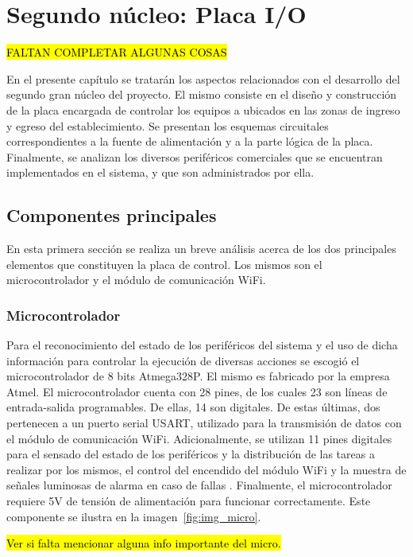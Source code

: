 \chapter{Segundo núcleo: Placa I/O}  \label{cap:2do-nucleo}

\hl{FALTAN COMPLETAR ALGUNAS COSAS}

En el presente capítulo se tratarán los aspectos relacionados con el desarrollo del segundo gran núcleo del proyecto. El mismo consiste en el diseño y construcción de la placa encargada de controlar los equipos a ubicados en las zonas de ingreso y egreso del establecimiento. Se presentan los esquemas circuitales correspondientes a la fuente de alimentación y a la parte lógica de la placa. Finalmente, se analizan los diversos periféricos comerciales que se encuentran implementados en el sistema, y que son administrados por ella. 

\section{Componentes principales}
En esta primera sección se realiza un breve análisis acerca de los dos principales elementos que constituyen la placa de control. Los mismos son el microcontrolador y el módulo de comunicación WiFi. 

\subsection{Microcontrolador}
Para el reconocimiento del estado de los periféricos del sistema y el uso de dicha información para controlar la ejecución de diversas acciones se escogió el microcontrolador de 8 bits Atmega328P. El mismo es fabricado por la empresa Atmel. El microcontrolador cuenta con 28 pines, de los cuales 23 son líneas de entrada-salida programables. De ellas, 14 son digitales. De estas últimas, dos pertenecen a un puerto serial USART, utilizado para la transmisión de datos con el módulo de comunicación WiFi. Adicionalmente, se utilizan 11 pines digitales para el sensado del estado de los periféricos y la distribución de las tareas a realizar por los mismos, el control del encendido del módulo WiFi y la muestra de señales luminosas de alarma en caso de fallas \cite{atmega328p}. Finalmente, el microcontrolador requiere 5V de tensión de alimentación para funcionar correctamente. Este componente se ilustra en la imagen~\ref{fig:img_micro}.

\hl{Ver si falta mencionar alguna info importante del micro.}

